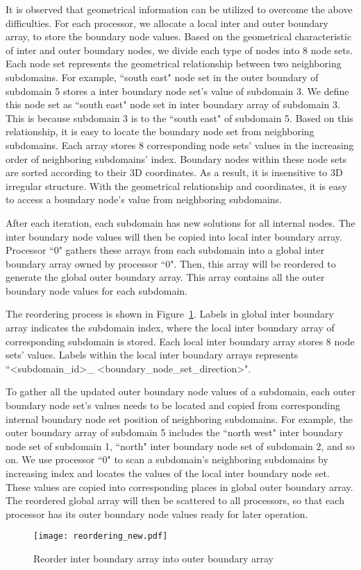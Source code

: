 \documentclass{sig-alternate}
\begin{document}
	It is observed that geometrical information can be utilized to overcome the above difficulties. For each processor, we allocate 
	a local inter and outer boundary array, to store the boundary node values. Based on the geometrical 
	characteristic of inter and outer boundary nodes, we divide each type of nodes into 8 node sets. Each node set represents the
	geometrical relationship between two neighboring subdomains. For example, ``south east" node set in the outer boundary of 
	subdomain 5 stores a inter boundary node set's value of subdomain 3. We define this node set as ``south east" node set in inter
	boundary array of subdomain 3. This is because subdomain 3 is to the ``south east" of subdomain 5. Based on this relationship,
	it is easy to locate the boundary node set from neighboring subdomains. Each array stores 8 corresponding node sets' values in 
	the increasing order of neighboring subdomains' index.  Boundary nodes within 
	these node sets are sorted according to their 3D coordinates. As a result, it is insensitive to 3D irregular structure. With the
	geometrical relationship and coordinates, it is easy to access a boundary node's value from neighboring subdomains. 

	After each iteration, each subdomain has new solutions for all internal nodes. The inter 
	boundary node values will then be copied into local inter boundary array. Processor ``0" gathers these arrays from each subdomain
	into a global inter boundary array owned by processor ``0". Then, this array will be reordered to generate the global outer 
	boundary array. This array
	contains all the outer boundary node values for each subdomain. 

	The reordering process is shown in Figure~\ref{Fig4}. Labels in global inter boundary array indicates the subdomain index, where
	the local inter boundary array of corresponding subdomain is stored. Each local inter boundary array stores 8 node sets' values. 
	Labels within the local inter boundary arrays represents ``<subdomain\_id>\_
	<boundary\_node\_set\_direction>".

	To gather all the updated outer boundary node values of a subdomain, each outer boundary node set's values needs to be located
	and copied from corresponding internal boundary node set position of neighboring subdomains. For example, the 
	outer boundary array of subdomain 5 includes the ``north west" inter boundary node set of subdomain 1, ``north" inter boundary 
	node set of 
	subdomain 2, and so on. We use processor ``0" to scan a subdomain's neighboring subdomains by increasing index and locates the
	values of the 
	local inter boundary node set. These values are copied into corresponding places in global outer boundary array. The 
	reordered global array will then be scattered to all processors, so that each processor has its outer boundary node values 
	ready for later operation. 
	\begin{figure}[htbp]
	  \centering
	  \texttt{[image: reordering\_new.pdf]}
	  \caption{Reorder inter boundary array into outer boundary array}
	  \label{Fig4}
	\end{figure}
\end{document}
